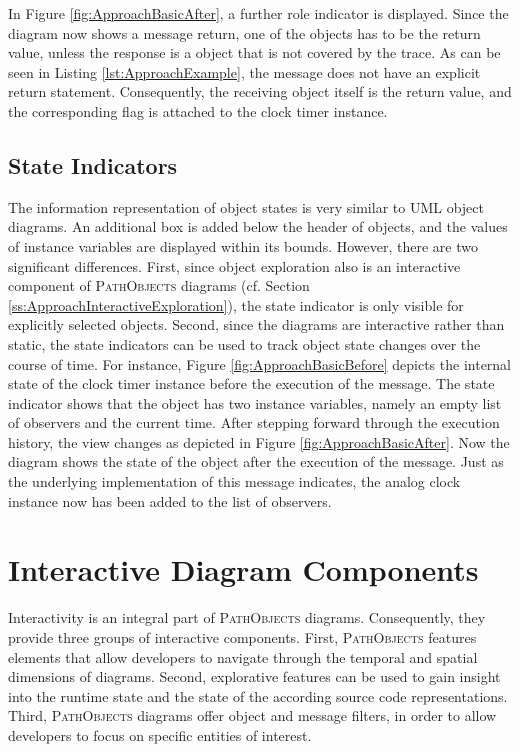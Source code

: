 In Figure \ref{fig:ApproachBasicAfter}, a further role indicator is displayed.
Since the diagram now shows a message return, one of the objects has to be the return value, unless the response is a object that is not covered by the trace.
As can be seen in Listing \ref{lst:ApproachExample}, the  message does not have an explicit return statement.
Consequently, the receiving object itself is the return value, and the corresponding flag is attached to the clock timer instance.

\subsection{State Indicators}
\label{ss:ApproachNotationState}
The information representation of object states is very similar to UML object diagrams.
An additional box is added below the header of objects, and the values of instance variables are displayed within its bounds.
However, there are two significant differences.
First, since object exploration also is an interactive component of \textsc{PathObjects} diagrams (cf. Section \ref{ss:ApproachInteractiveExploration}), the state indicator is only visible for explicitly selected objects.
Second, since the diagrams are interactive rather than static, the state indicators can be used to track object state changes over the course of time.
For instance, Figure \ref{fig:ApproachBasicBefore} depicts the internal state of the clock timer instance before the execution of the  message.
The state indicator shows that the object has two instance variables, namely an empty list of observers and the current time.
After stepping forward through the execution history, the view changes as depicted in Figure \ref{fig:ApproachBasicAfter}.
Now the diagram shows the state of the object after the execution of the  message.
Just as the underlying implementation of this message indicates, the analog clock instance now has been added to the list of observers.

\section[Interactive Diagram Components]{Interactive Diagram Components%
}
\label{s:ApproachInteractivity}
Interactivity is an integral part of \textsc{PathObjects} diagrams.
Consequently, they provide three groups of interactive components.
First, \textsc{PathObjects} features elements that allow developers to navigate through the temporal and spatial dimensions of diagrams.
Second, explorative features can be used to gain insight into the runtime state and the state of the according source code representations.
Third, \textsc{PathObjects} diagrams offer object and message filters, in order to allow developers to focus on specific entities of interest.

